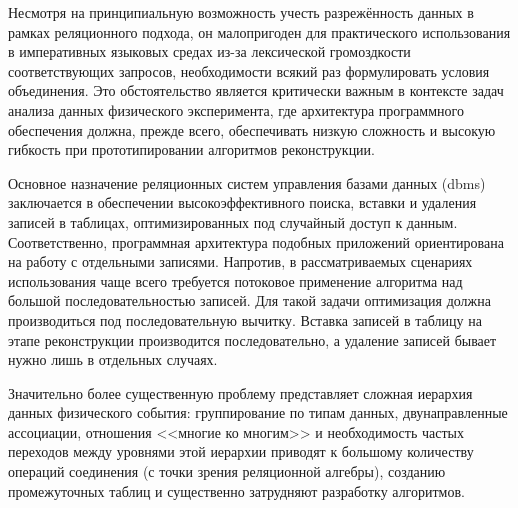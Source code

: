 Несмотря на принципиальную возможность учесть разрежённость данных в
рамках реляционного подхода, он малопригоден для практического
использования в императивных языковых средах из-за лексической громоздкости
соответствующих запросов, необходимости всякий раз формулировать условия
объединения. Это обстоятельство является критически важным в контексте
задач анализа данных физического эксперимента, где архитектура
программного обеспечения должна, прежде всего, обеспечивать
низкую сложность и высокую гибкость при прототипировании алгоритмов
реконструкции.

Основное назначение реляционных систем управления базами данных
(\acrshort{dbms}) заключается в обеспечении высокоэффективного поиска, вставки
и удаления записей в таблицах, оптимизированных под случайный доступ
к данным. Соответственно, программная архитектура подобных приложений
ориентирована на работу с отдельными записями.
Напротив, в рассматриваемых сценариях использования чаще всего требуется потоковое
применение алгоритма над большой последовательностью записей.
Для такой задачи оптимизация должна производиться под
последовательную вычитку. Вставка записей в таблицу
на этапе реконструкции производится последовательно, а удаление
записей бывает нужно лишь в отдельных случаях.

Значительно более существенную проблему представляет сложная
иерархия данных физического события: группирование по типам
данных, двунаправленные ассоциации, отношения <<многие ко многим>>
и необходимость частых переходов между уровнями этой иерархии
приводят к большому количеству операций соединения (с точки зрения
реляционной алгебры), созданию промежуточных таблиц и существенно
затрудняют разработку алгоритмов.

